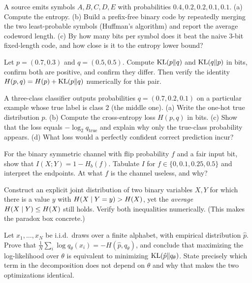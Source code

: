 \begin{exercise}
\label{ch33:ex-huffman}
A source emits symbols $A,B,C,D,E$ with probabilities $0.4, 0.2, 0.2, 0.1, 0.1$. (a) Compute the entropy.
(b) Build a prefix-free binary code by repeatedly merging the two least-probable symbols (Huffman's
algorithm) and report the average codeword length. (c) By how many bits per symbol does it beat the naive
$3$-bit fixed-length code, and how close is it to the entropy lower bound?
\end{exercise}

\begin{exercise}
\label{ch33:ex-kl-asym}
Let $p = (0.7, 0.3)$ and $q = (0.5, 0.5)$. Compute $\operatorname{KL}(p\|q)$ and $\operatorname{KL}(q\|p)$ in bits, confirm both are
positive, and confirm they differ. Then verify the identity $H(p,q) = H(p) + \operatorname{KL}(p\|q)$ numerically for
this pair.
\end{exercise}

\begin{exercise}
\label{ch33:ex-crossent-loss}
A three-class classifier outputs probabilities $q = (0.7, 0.2, 0.1)$ on a particular example whose true
label is class $2$ (the middle one). (a) Write the one-hot true distribution $p$. (b) Compute the
cross-entropy loss $H(p,q)$ in bits. (c) Show that the loss equals $-\log_2 q_{\text{true}}$ and explain
why only the true-class probability appears. (d) What loss would a perfectly confident correct prediction
incur?
\end{exercise}

\begin{exercise}
\label{ch33:ex-bsc}
For the binary symmetric channel with flip probability $f$ and a fair input bit, show that $I(X;Y) = 1 -
H_b(f)$. Tabulate $I$ for $f \in \{0, 0.1, 0.25, 0.5\}$ and interpret the endpoints. At what $f$
is the channel useless, and why?
\end{exercise}

\begin{exercise}
\label{ch33:ex-conditioning}
Construct an explicit joint distribution of two binary variables $X,Y$ for which there is a value $y$ with
$H(X\mid Y=y) > H(X)$, yet the \emph{average} $H(X\mid Y) \le H(X)$ still holds. Verify both
inequalities numerically. (This makes the paradox box concrete.)
\end{exercise}

\begin{exercise}
\label{ch33:ex-mle-proof}
Let $x_1,\dots,x_N$ be i.i.d.\ draws over a finite alphabet, with empirical distribution $\hat p$. Prove
that $\frac1N\sum_i \log q_\theta(x_i) = -H(\hat p, q_\theta)$, and conclude that maximizing the
log-likelihood over $\theta$ is equivalent to minimizing $\operatorname{KL}(\hat p\|q_\theta)$. State precisely which
term in the decomposition does not depend on $\theta$ and why that makes the two optimizations identical.
\end{exercise}

